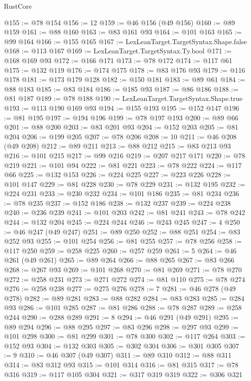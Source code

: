 \begin{lexlean}{RustCore}
\begin{coremodule}
@155 := @78 @154
@156 := 12
@159 := @46 @156 (@49 @156)
@160 := @89 @159
@161 := @88 @160
@163 := @83 @161 @93
@164 := @101 @163
@165 := @99 @164
@166 := @155 @165
@167 := LexLeanTarget.TargetSyntax.Shape.false
@168 := @113 @167
@169 := LexLeanTarget.TargetSyntax.Ty.bool
@171 := @168 @169 @93
@172 := @166 @171
@173 := @78 @172
@174 := @117 @61
@175 := @132 @119
@176 := @174 @175
@178 := @83 @176 @93
@179 := @116 @178
@181 := @173 @179 @128
@182 := @150 @181
@183 := @89 @61
@184 := @88 @183
@185 := @83 @184
@186 := @185 @93
@187 := @86 @186
@188 := @81 @187
@189 := @78 @188
@190 := LexLeanTarget.TargetSyntax.Shape.true
@193 := @113 @190 @169 @93
@194 := @155 @193
@195 := @152 @147
@196 := @81 @195
@197 := @194 @196
@199 := @78 @197 @193
@200 := @89 @66
@201 := @88 @200
@203 := @83 @201 @93
@204 := @152 @203
@205 := @81 @204
@206 := @199 @205
@207 := @78 @206
@208 := 10
@211 := @46 @208 (@49 @208)
@212 := @89 @211
@213 := @88 @212
@215 := @83 @213 @93
@216 := @101 @215
@217 := @99 @216
@219 := @207 @217 @171
@220 := @78 @219
@221 := @101 @94
@222 := @81 @221
@223 := @78 @222
@224 := @117 @66
@225 := @132 @153
@226 := @224 @225
@227 := @223 @226
@228 := @101 @147
@229 := @81 @228
@230 := @78 @229
@231 := @132 @195
@232 := @224 @231
@233 := @230 @232
@234 := @101 @186
@235 := @81 @234
@236 := @78 @235
@237 := @152 @186
@238 := @132 @237
@239 := @224 @238
@240 := @236 @239
@241 := @101 @203
@242 := @81 @241
@243 := @78 @242
@244 := @132 @204
@245 := @224 @244
@246 := @243 @245
@247 := 4
@250 := @46 @247 (@49 @247)
@251 := @89 @250
@252 := @88 @251
@254 := @83 @252 @93
@255 := @101 @254
@256 := @81 @255
@257 := @78 @256
@258 := @117 @250
@259 := @258 @225
@260 := @257 @259
@261 := 5
@264 := @46 @261 (@49 @261)
@265 := @89 @264
@266 := @88 @265
@267 := @83 @266
@268 := @267 @93
@269 := @101 @268
@270 := @81 @269
@271 := @78 @270
@272 := @258 @231
@273 := @271 @272
@274 := @81 @110
@275 := @78 @274
@276 := @258 @238
@277 := @275 @276
@278 := 7
@281 := @46 @278 (@49 @278)
@282 := @89 @281
@283 := @88 @282
@284 := @83 @283
@285 := @284 @93
@286 := @101 @285
@287 := @81 @286
@288 := @78 @287
@289 := @258 @244
@290 := @288 @289
@291 := 8
@294 := @46 @291 (@49 @291)
@295 := @89 @294
@296 := @88 @295
@297 := @83 @296
@298 := @297 @93
@299 := @101 @298
@300 := @81 @299
@301 := @78 @300
@302 := @117 @264
@303 := @152 @93
@304 := @132 @303
@305 := @302 @304
@306 := @301 @305
@307 := 9
@310 := @46 @307 (@49 @307)
@311 := @89 @310
@312 := @88 @311
@314 := @83 @312 @93
@315 := @101 @314
@316 := @81 @315
@317 := @78 @316
@319 := @117 @105 @304
@321 := @317 @319 @319
@322 := @306 @321

\end{coremodule}
\end{lexlean}
